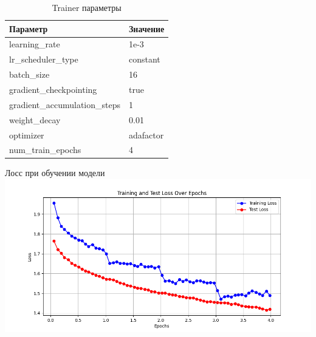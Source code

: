 \documentclass[LI,VKR]{HSEUniversity}
\begin{document}
\begin{longtable}{ll}
\caption{Trainer параметры} \\
\hline
\textbf{Параметр} & \textbf{Значение} \\
\hline
learning\_rate & 1e-3 \\
lr\_scheduler\_type & constant \\
batch\_size & 16 \\
gradient\_checkpointing & true \\
gradient\_accumulation\_steps & 1 \\
weight\_decay & 0.01 \\
optimizer & adafactor \\
num\_train\_epochs & 4 \\
\hline
\end{longtable}

\begin{FIGURE}[h]{Лосс при обучении модели \label{fig:loss-plot-epoch}}
\includegraphics[width=1.0\textwidth]{img/loss-plot-epoch}
\end{FIGURE}
\end{document}
